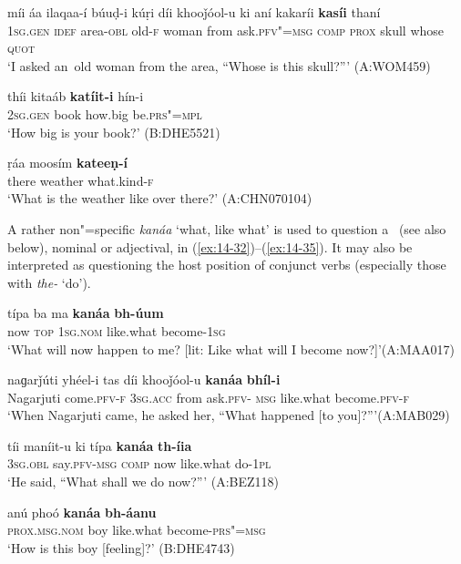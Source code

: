 \begin{exe}
\ex
\label{ex:14-29}
\gll míi áa ilaqaa-í búuḍ-i kúṛi díi khooǰóol-u  ki aní kakaríi \textbf{kasíi} thaní \\
\textsc{1sg.gen} \textsc{idef} area-\textsc{obl} old-\textsc{f} woman from ask.\textsc{pfv"=msg} \textsc{comp} \textsc{prox} skull whose \textsc{quot} \\
\glt `I asked an~old woman from the area, ``Whose is this skull?''' (A:WOM459)

\ex
\label{ex:14-30}
\gll thíi kitaáb \textbf{katíit-i} hín-i \\
\textsc{2sg.gen} book how.big be.\textsc{prs"=mpl} \\
\glt `How big is your book?' (B:DHE5521)

\ex
\label{ex:14-31}
\gll ṛáa moosím \textbf{kateeṇ-í} \\
there weather what.kind-\textsc{f} \\
\glt `What is the weather like over there?' (A:CHN070104)
\end{exe}

A rather non"=specific \textit{kanáa} `what, like what' is used to question a~  (see also below), nominal or adjectival, in (\ref{ex:14-32})--(\ref{ex:14-35}). It may also be interpreted as questioning the host position of conjunct verbs (especially those with \textit{the-} `do'). 

\begin{exe}
\ex
\label{ex:14-32}
\gll típa ba ma \textbf{kanáa} \textbf{bh-úum} \\
now \textsc{top} \textsc{1sg.nom} like.what become-\textsc{1sg} \\
\glt `What will now happen to me? [lit: Like what will I become now?]'\newline (A:MAA017)

\ex
\label{ex:14-33}
\gll naɡarǰúti yhéel-i tas díi khooǰóol-u \textbf{kanáa} \textbf{bhíl-i}\\
Nagarjuti come.\textsc{pfv-f} \textsc{3sg.acc} from ask.\textsc{pfv- msg} like.what become.\textsc{pfv-f}\\
\glt `When Nagarjuti came, he asked her, ``What happened [to you]?'''\newline (A:MAB029)

\ex
\label{ex:14-34}
\gll tíi maníit-u ki típa \textbf{kanáa} \textbf{th-íia} \\
\textsc{3sg.obl} say.\textsc{pfv-msg} \textsc{comp} now like.what do-\textsc{1pl} \\
\glt `He said, ``What shall we do now?''' (A:BEZ118)

\ex
\label{ex:14-35}
\gll anú phoó \textbf{kanáa} \textbf{bh-áanu} \\
\textsc{prox.msg.nom} boy like.what become-\textsc{prs"=msg} \\
\glt `How is this boy [feeling]?' (B:DHE4743)
\end{exe}

